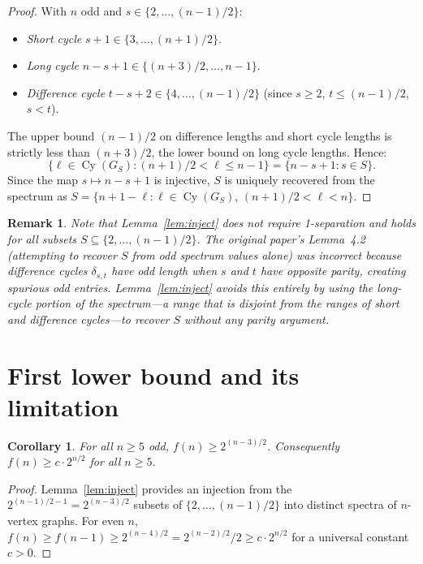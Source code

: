 \documentclass[11pt]{amsart}
\newtheorem{corollary}[theorem]{Corollary}
\newtheorem{remark}[theorem]{Remark}
\DeclareMathOperator{\Cy}{Cy}
\begin{document}
\begin{proof}
With $n$ odd and $s\in\{2,\ldots,(n-1)/2\}$:
\begin{itemize}
  \item \emph{Short cycle} $s+1\in\{3,\ldots,(n+1)/2\}$.
  \item \emph{Long cycle} $n-s+1\in\{(n+3)/2,\ldots,n-1\}$.
  \item \emph{Difference cycle} $t-s+2\in\{4,\ldots,(n-1)/2\}$
    (since $s\ge 2$, $t\le(n-1)/2$, $s<t$).
\end{itemize}
The upper bound $(n-1)/2$ on difference lengths and short cycle lengths is strictly
less than $(n+3)/2$, the lower bound on long cycle lengths.  Hence:
\[
  \{\ell\in\Cy(G_S):(n+1)/2<\ell\le n-1\}
  =\{n-s+1:s\in S\}.
\]
Since the map $s\mapsto n-s+1$ is injective, $S$ is uniquely recovered from the
spectrum as $S=\{n+1-\ell:\ell\in\Cy(G_S),\,(n+1)/2<\ell<n\}$.
\end{proof}

\begin{remark}\label{rem:why_original_fails}
Note that Lemma~\ref{lem:inject} does \emph{not} require 1-separation and holds for
\emph{all} subsets $S\subseteq\{2,\ldots,(n-1)/2\}$.  The original paper's
Lemma~4.2 (attempting to recover $S$ from odd spectrum values alone) was incorrect
because difference cycles $\delta_{s,t}$ have odd length when $s$ and $t$ have
opposite parity, creating spurious odd entries.  Lemma~\ref{lem:inject} avoids this
entirely by using the long-cycle portion of the spectrum---a range that is
\emph{disjoint} from the ranges of short and difference cycles---to recover $S$
without any parity argument.
\end{remark}

\section{First lower bound and its limitation}\label{sec:first_bound}

\begin{corollary}\label{cor:first}
For all $n\ge 5$ odd, $f(n)\ge 2^{(n-3)/2}$.  Consequently $f(n)\ge c\cdot 2^{n/2}$
for all $n\ge 5$.
\end{corollary}

\begin{proof}
Lemma~\ref{lem:inject} provides an injection from
the $2^{(n-1)/2-1}=2^{(n-3)/2}$ subsets of $\{2,\ldots,(n-1)/2\}$ into distinct
spectra of $n$-vertex graphs.  For even $n$, $f(n)\ge f(n-1)\ge 2^{(n-4)/2}=
2^{(n-2)/2}/2\ge c\cdot 2^{n/2}$ for a universal constant $c>0$.
\end{proof}
\end{document}

